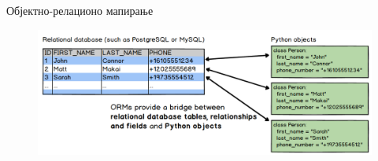 \documentclass{beamer}
\begin{document}
\begin{frame}[allowframebreaks]{Објектно-релационо мапирање}
        \begin{figure}
            \centering
            \includegraphics[width=\textwidth,height=\textheight,keepaspectratio]{images/orm.png}
            \label{fig:orm}
        \end{figure}
    \end{frame}
    
\end{document}
